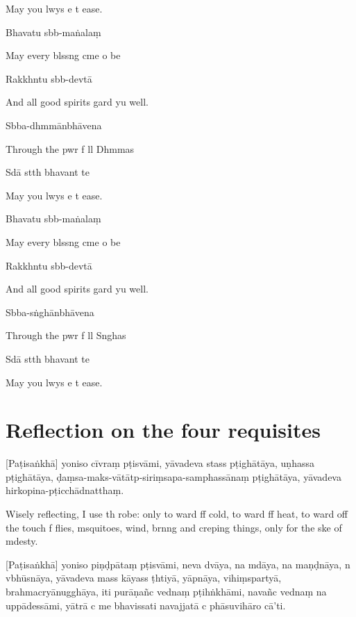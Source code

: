 May you lwys e t ease.

Bhavatu sbb-maṅalaṃ

May every blssng cme o be

Rakkhntu sbb-devtā

And all good spirits gard yu well.

Sbba-dhmmānbhāvena

Through the pwr f ll Dhmmas

Sdā stth bhavant te

May you lwys e t ease.

Bhavatu sbb-maṅalaṃ

May every blssng cme o be

Rakkhntu sbb-devtā

And all good spirits gard yu well.

Sbba-sṅghānbhāvena

Through the pwr f ll Snghas

Sdā stth bhavant te

May you lwys e t ease.

\chapter[Four requisites]{Reflection on the four requisites}

\begin{leader}
\end{leader}

[Paṭisaṅkhā] yoniso cīvraṃ pṭisvāmi, yāvadeva stass pṭighātāya, uṇhassa pṭighātāya, ḍaṃsa-maks-vātātp-siriṃsapa-samphassānaṃ pṭighātāya, yāvadeva hirkopina-pṭicchādnatthaṃ.

Wisely reflecting, I use th robe: only to ward ff cold, to ward ff heat, to ward off the touch f flies, msquitoes, wind, brnng and creping things, only for the ske of mdesty.

[Paṭisaṅkhā] yoniso piṇḍpātaṃ pṭisvāmi, neva dvāya, na mdāya, na maṇḍnāya, n vbhūsnāya, yāvadeva mass kāyass ṭhtiyā, yāpnāya, vihiṃspartyā, brahmacryānugghāya, iti purāṇañc vednaṃ pṭihṅkhāmi, navañc vednaṃ na uppādessāmi, yātrā c me bhavissati navajjatā c phāsuvihāro cā'ti.

